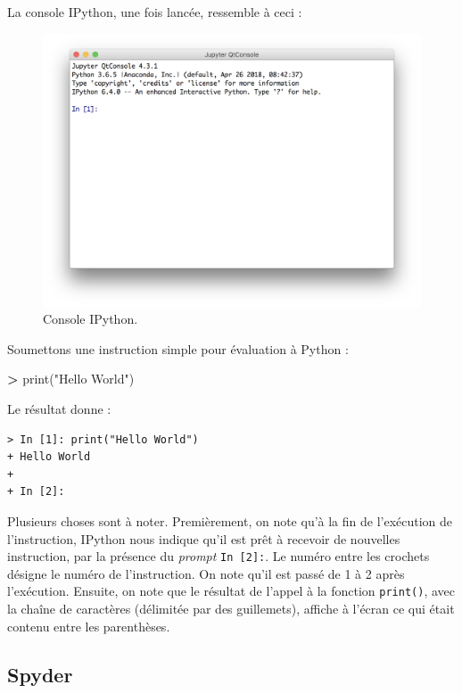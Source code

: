 \documentclass[12pt,]{book}
\newenvironment{Shaded}{\begin{snugshade}}{\end{snugshade}}
\newcommand{\StringTok}[1]{\textcolor[rgb]{0.31,0.60,0.02}{#1}}
\newcommand{\OperatorTok}[1]{\textcolor[rgb]{0.81,0.36,0.00}{\textbf{#1}}}
\newcommand{\BuiltInTok}[1]{#1}
\newcommand{\NormalTok}[1]{#1}
\numberwithin{equation}{section}
\numberwithin{countremarque}{section}
\begin{document}
La console IPython, une fois lancée, ressemble à ceci :

\begin{figure}[H]

{\centering \includegraphics[width=0.7\linewidth]{figs/ipython} 

}

\caption{Console IPython.}\label{fig:unnamed-chunk-5}
\end{figure}

Soumettons une instruction simple pour évaluation à Python :

\begin{Shaded}
\begin{Highlighting}[]
\OperatorTok{>} \BuiltInTok{print}\NormalTok{(}\StringTok{"Hello World"}\NormalTok{)}
\end{Highlighting}
\end{Shaded}

Le résultat donne :

\begin{lstlisting}
> In [1]: print("Hello World")
+ Hello World
+ 
+ In [2]:
\end{lstlisting}

Plusieurs choses sont à noter. Premièrement, on note qu'à la fin de
l'exécution de l'instruction, IPython nous indique qu'il est prêt à
recevoir de nouvelles instruction, par la présence du \emph{prompt}
\texttt{In\ {[}2{]}:}. Le numéro entre les crochets désigne le numéro de
l'instruction. On note qu'il est passé de 1 à 2 après l'exécution.
Ensuite, on note que le résultat de l'appel à la fonction
\texttt{print()}, avec la chaîne de caractères (délimitée par des
guillemets), affiche à l'écran ce qui était contenu entre les
parenthèses.

\subsection{Spyder}\label{spyder}
\end{document}

